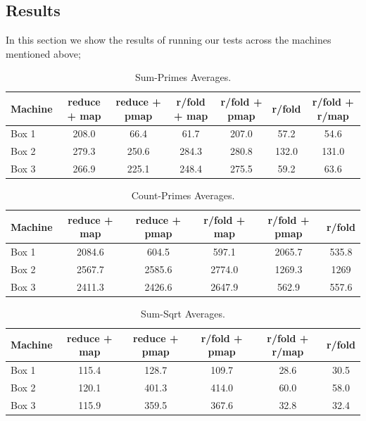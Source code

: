 \documentclass[12pt]{article}
\begin{document}
\subsection{Results}\label{sec:results}
In this section we show the results of running our tests across the machines mentioned above;

\begin{table}[h!]
\begin{center}
\begin{tabular}{|l|c|c|c|c|c|c|}
\hline
Machine & reduce + map & reduce + pmap & r/fold + map & r/fold + pmap & r/fold & r/fold + r/map \\
\hline
Box 1 & 208.0 & 66.4 & 61.7 & 207.0 & 57.2 &  54.6 \\
Box 2 & 279.3 & 250.6 & 284.3 & 280.8 & 132.0 & 131.0 \\
Box 3 & 266.9 & 225.1 & 248.4 & 275.5 & 59.2 & 63.6 \\
\hline
\end{tabular}
\end{center}
\caption{Sum-Primes Averages.}\label{table:sum-primes}
\end{table}

\begin{table}[h!]
\begin{center}
\begin{tabular}{|l|c|c|c|c|c|}
\hline
Machine & reduce + map & reduce + pmap & r/fold + map & r/fold + pmap & r/fold\\
\hline
Box 1 & 2084.6 & 604.5 & 597.1 & 2065.7 & 535.8\\
Box 2 & 2567.7 & 2585.6 & 2774.0 & 1269.3 & 1269 \\
Box 3 & 2411.3 & 2426.6 & 2647.9 & 562.9 & 557.6\\
\hline
\end{tabular}
\end{center}
\caption{Count-Primes Averages.}\label{table:sum-primes}
\end{table}

\begin{table}[h!]
\begin{center}
\begin{tabular}{|l|c|c|c|c|c|}
\hline
Machine & reduce + map & reduce + pmap & r/fold + pmap & r/fold + r/map & r/fold\\
\hline
Box 1 & 115.4 & 128.7 & 109.7 & 28.6 & 30.5\\
Box 2 & 120.1 & 401.3 & 414.0 & 60.0 & 58.0 \\
Box 3 & 115.9 & 359.5 & 367.6 & 32.8 & 32.4\\
\hline
\end{tabular}
\end{center}
\caption{Sum-Sqrt Averages.}\label{table:sum-primes}
\end{table}
\end{document}
